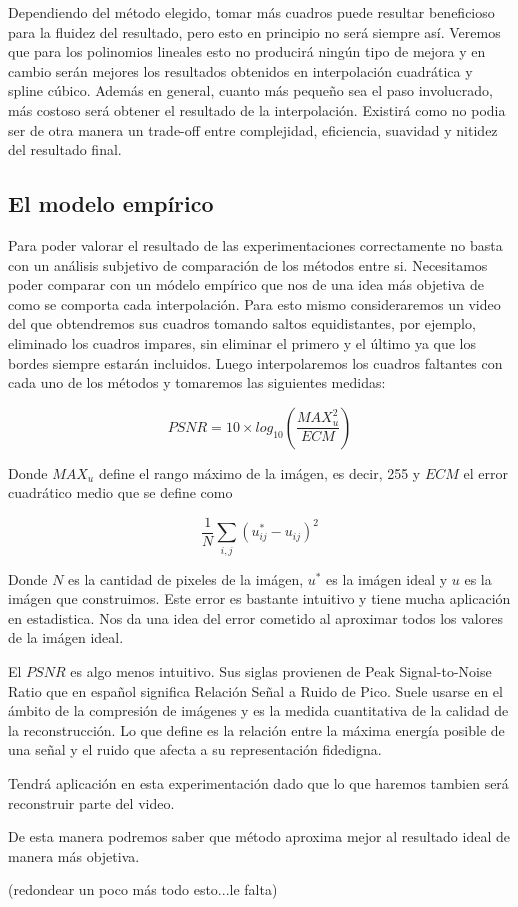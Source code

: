 Dependiendo del método elegido, tomar más cuadros puede resultar beneficioso para la fluidez del resultado, pero esto en principio no será siempre así. Veremos que para los polinomios lineales esto no producirá ningún tipo de mejora y en cambio serán mejores los resultados obtenidos en interpolación cuadrática y spline cúbico. Además en general, cuanto más pequeño sea el paso involucrado, más costoso será obtener el resultado de la interpolación. Existirá como no podia ser de otra manera un trade-off entre complejidad, eficiencia, suavidad y nitidez del resultado final. 
 
\subsection{El modelo empírico}

Para poder valorar el resultado de las experimentaciones correctamente no basta con un análisis subjetivo de comparación de los métodos entre si. Necesitamos poder comparar con un módelo empírico que nos de una idea más objetiva de como se comporta cada interpolación. Para esto mismo consideraremos un video del que obtendremos sus cuadros tomando saltos equidistantes, por ejemplo, eliminado los cuadros impares, sin eliminar el primero y el último ya que los bordes siempre estarán incluidos. Luego interpolaremos los cuadros faltantes con cada uno de los métodos y tomaremos las siguientes medidas:

\begin{equation}
	PSNR = 10 \times log_{10}(\dfrac{MAX_u^2}{ECM})
\end{equation}

Donde $MAX_u$ define el rango máximo de la imágen, es decir, 255 y $ECM$ el error cuadrático medio que se define como

\begin{equation}
	\dfrac{1}{N}\sum_{i,j}(u_{ij}^* - u_{ij})^2
\end{equation}

Donde $N$ es la cantidad de pixeles de la imágen, $u^*$ es la imágen ideal y $u$ es la imágen que construimos. Este error es bastante intuitivo y tiene mucha aplicación en estadistica. Nos da una idea del error cometido al aproximar todos los valores de la imágen ideal. 

El $PSNR$ es algo menos intuitivo. Sus siglas provienen de Peak Signal-to-Noise Ratio que en español significa Relación Señal a Ruido de Pico. Suele usarse en el ámbito de la compresión de imágenes y es la medida cuantitativa de la calidad de la reconstrucción. Lo que define es la relación entre la máxima energía posible de una señal y el ruido que afecta a su representación fidedigna. 

Tendrá aplicación en esta experimentación dado que lo que haremos tambien será reconstruir parte del video.

De esta manera podremos saber que método aproxima mejor al resultado ideal de manera más objetiva. 

(redondear un poco más todo esto...le falta)










